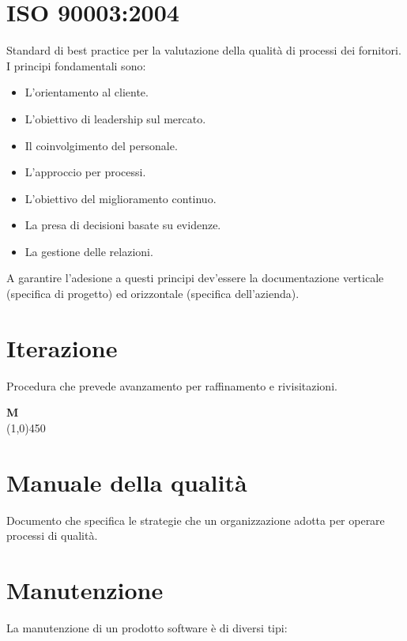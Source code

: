 	\section{ISO 90003:2004}
	\label{sec:iso90003}
	Standard di best practice per la valutazione della qualità di processi dei fornitori. I principi fondamentali sono:
	\begin{itemize}  
	\item L'orientamento al cliente.
	\item L'obiettivo di leadership sul mercato.
	\item Il coinvolgimento del personale.
	\item L'approccio per processi.
	\item L'obiettivo del miglioramento continuo.
	\item La presa di decisioni basate su evidenze.
	\item La gestione delle relazioni.
	\end{itemize}	
	A garantire l'adesione a questi principi dev'essere la documentazione verticale (specifica di progetto) ed orizzontale (specifica dell'azienda).	
	
	\section{Iterazione}
	\label{sec:iterazione}
	Procedura che prevede avanzamento per raffinamento e rivisitazioni.\newpage

	{\Huge{\textbf{M}}} \\
	\line(1,0){450}
	
	\section{Manuale della qualità}
	\label{sec:manualequalita}
	Documento che specifica le strategie che un organizzazione adotta per operare processi di qualità.
	
	
	\section{Manutenzione}
	\label{sec:manutenzione}
	La manutenzione di un prodotto software è di diversi tipi:
		
